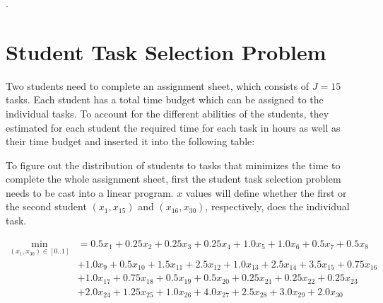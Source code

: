\documentclass[12pt]{article}         %
\begin{document}
	.


\section{Student Task Selection Problem}

Two students need to complete an assignment sheet, which consists of $J= 15$ tasks.  Each student has a total time budget which can be assigned to the individual tasks. To account for the different abilities of the students, they estimated for each student the required time for each task in hours as well as their time budget and inserted it into the following table:

\begin{table}[h]
\end{table}

To figure out the distribution of students to tasks that minimizes the time to complete the whole assignment sheet, first the student task selection problem needs to be cast into a linear program. $x$ values will define whether the first or the second student  $(x_1, x_{15})$ and $(x_{16}, x_{30})$, respectively, does the individual task.
 
 $$
 \begin{aligned}
 \min_{(x_1,x_{30})\in[0 .. 1]} &= 0.5x_1 + 0.25x_2 + 0.25x_3 + 0.25x_4 + 1.0x_5 + 1.0x_6+ 0.5x_7 + 0.5x_8\\&+ 1.0x_9 +0.5x_{10}+ 1.5x_{11}+ 2.5x_{12}+ 1.0x_{13}+ 2.5x_{14}+ 3.5x_{15}+
 0.75x_{16}\\ &+ 1.0x_{17}+  0.75x_{18}+ 0.5 x_{19}+ 0.5x_{20}+ 0.25x_{21}+ 0.25x_{22}+ 0.25x_{23}\\ &+2.0x_{24}+ 1.25x_{25}+1.0x_{26}+ 4.0x_{27}+ 2.5x_{28}+ 3.0 x_{29}+ 2.0x_{30}
 \end{aligned}
$$
\end{document}
